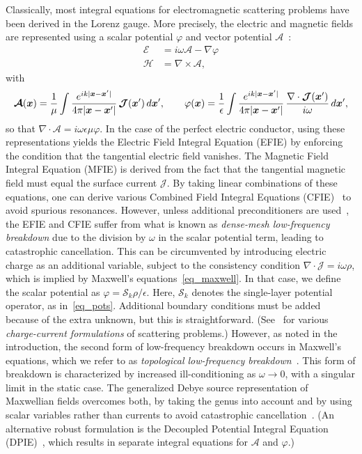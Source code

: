 \documentclass[11pt]{article}
\newcommand{\vct}{\vectorsym}
\newcommand{\bx}{\vct{ x}}
\newcommand{\bcE}{\bm{{\mathcal E}}}
\newcommand{\bcA}{\bm{\mathcal A}}
\newcommand{\bcH}{\bm{\mathcal H}}
\newcommand{\bcJ}{\bm{\mathcal J}}
\newcommand{\cS}{\mathcal S}
\numberwithin{equation}{section}
\begin{document}
Classically, most integral equations for electromagnetic scattering
problems have been derived in the Lorenz gauge. More precisely,
the electric and magnetic fields are represented
using a scalar potential $\varphi$ and vector potential
$\bcA$~\cite{papas}:
\begin{equation}
  \begin{aligned}
    \bcE &= i\omega \bcA - \nabla \varphi \\
    \bcH &=  \nabla \times \bcA,
  \end{aligned}
\end{equation}
with
\begin{equation}\label{eq_pots}
  \bcA(\bx) = \frac{1}{\mu} \int \frac{e^{ik|\bx-\bx'|}}{4\pi | \bx-\bx'
    |} \, \bcJ(\bx') \, d\bx', \qquad
  \varphi(\bx) = \frac{1}{\epsilon} \int \frac{e^{ik|\bx-\bx'|}}{4\pi | \bx-\bx'
    |} \, \frac{\nabla \cdot \bcJ(\bx') }{i\omega} \, d\bx',
\end{equation}
so that $\nabla \cdot \bcA = i\omega\epsilon\mu\varphi$.  In the case
of the perfect electric conductor, using these representations yields
the Electric Field Integral Equation (EFIE) by enforcing the condition
that the tangential electric field vanishes. The Magnetic Field
Integral Equation (MFIE) is derived from the fact that the tangential
magnetic field must equal the surface current $\bcJ$. By taking linear
combinations of these equations, one can derive various Combined Field
Integral Equations (CFIE)~\cite{colton_kress} to avoid spurious
resonances.  However, unless additional preconditioners are
used~\cite{contopanagos-2002}, the EFIE and CFIE suffer from what is
known as \emph{dense-mesh low-frequency breakdown} due to the division
by $\omega$ in the scalar potential term, leading to catastrophic
cancellation.  This can be circumvented by introducing electric charge
as an additional variable, subject to the consistency condition
$\nabla \cdot \bcJ = i\omega \rho$, which is implied by Maxwell's
equations~\eqref{eq_maxwell}. In that case, we define the scalar
potential as $\varphi = \cS_k \rho/\epsilon$. Here, $\cS_k$ denotes
the single-layer potential operator, as in~\eqref{eq_pots}.
Additional boundary conditions must be added because of the extra
unknown, but this is
straightforward. (See~\cite{taskinen-2006,vico_2016,vico-2013} for
various \emph{charge-current formulations} of scattering problems.)
However, as noted in the introduction, the second form of
low-frequency breakdown occurs in Maxwell's equations, which we refer
to as \emph{topological low-frequency breakdown}~\cite{EpGr}.  This
form of breakdown is characterized by increased ill-conditioning as
$\omega \to 0$, with a singular limit in the static case.  The
generalized Debye source representation of Maxwellian fields overcomes
both, by taking the genus into account and by using scalar variables
rather than currents to avoid catastrophic cancellation~\cite{EpGr,
  EpGrOn}.  (An alternative robust formulation is the Decoupled
Potential Integral Equation (DPIE)~\cite{vico_2016}, which results in
separate integral equations for $\bcA$ and $\varphi$.)
\end{document}
